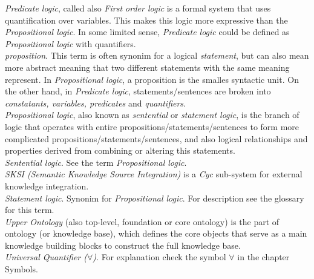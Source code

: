 \emph{Predicate logic}, called also \emph{First order logic} is a formal system
that uses quantification over variables. This makes this logic more expressive
than the \emph{Propositional logic}. In some limited sense, 
\emph{Predicate logic} could be defined as \emph{Propositional logic} with 
quantifiers.\\

\emph{proposition}. This term is often synonim for a logical \emph{statement},
but can also mean more abstract meaning that two different statements with the
same meaning represent. In \emph{Propositional logic}, a proposition is the
smalles syntactic unit. On the other hand, in \emph{Predicate logic}, 
statements/sentences are broken into \emph{constatants, variables, predicates}
and \emph{quantifiers}.\\

\emph{Propositional logic}, also known as \emph{sentential} or 
\emph{statement logic}, is the branch of logic that operates with entire
propositions/statements/sentences to form more complicated 
propositions/statements/sentences, and also logical relationships and properties
derived from combining  or altering this statements.\\

\emph{Sentential logic}. See the term \emph{Propositional logic}.\\

\emph{SKSI (Semantic Knowledge Source Integration)} is a \emph{Cyc} sub-system
for external knowledge integration.\\

\emph{Statement logic}. Synonim for \emph{Propositional logic}. For description
see the glossary for this term.\\

\emph{Upper Ontology} (also top-level, foundation or core ontology) is the part
of ontology (or knowledge base), which defines the core objects that serve as a
main knowledge building blocks to construct the full knowledge base.\\

\emph{Universal Quantifier ($\forall$)}. For explanation check the symbol 
$\forall$ in the chapter Symbols. \\
